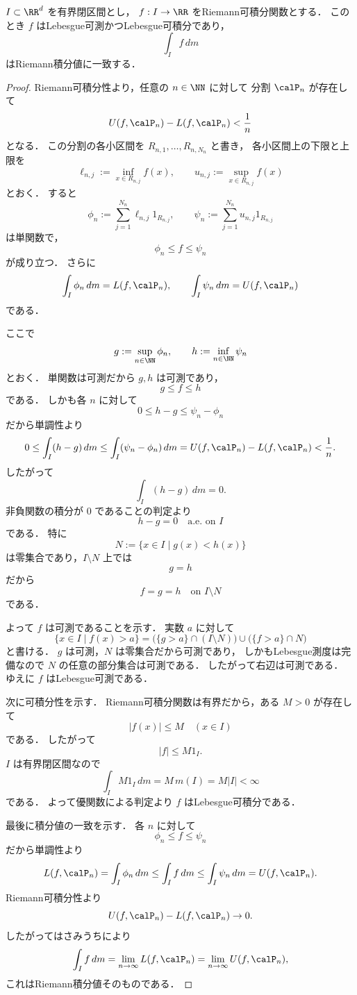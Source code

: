 \begin{theorem}[Riemann可積分ならLebesgue可積分]
$I \subset \RR^d$ を有界閉区間とし，
$f:I \to \RR$ をRiemann可積分関数とする．
このとき $f$ はLebesgue可測かつLebesgue可積分であり，
\[
\int_I f\,dm
\]
はRiemann積分値に一致する．
\end{theorem}
\begin{proof}
Riemann可積分性より，任意の $n \in \NN$ に対して
分割 $\calP_n$ が存在して
\[
U(f,\calP_n)-L(f,\calP_n)<\frac1n
\]
となる．
この分割の各小区間を $R_{n,1},\dots,R_{n,N_n}$ と書き，
各小区間上の下限と上限を
\[
\ell_{n,j}:=\inf_{x \in R_{n,j}} f(x),
\qquad
u_{n,j}:=\sup_{x \in R_{n,j}} f(x)
\]
とおく．
すると
\[
\phi_n:=\sum_{j=1}^{N_n} \ell_{n,j}1_{R_{n,j}},
\qquad
\psi_n:=\sum_{j=1}^{N_n} u_{n,j}1_{R_{n,j}}
\]
は単関数で，
\[
\phi_n \le f \le \psi_n
\]
が成り立つ．
さらに
\[
\int_I \phi_n\,dm = L(f,\calP_n),
\qquad
\int_I \psi_n\,dm = U(f,\calP_n)
\]
である．

ここで
\[
g:=\sup_{n\in\NN}\phi_n,
\qquad
h:=\inf_{n\in\NN}\psi_n
\]
とおく．
単関数は可測だから $g,h$ は可測であり，
\[
g \le f \le h
\]
である．
しかも各 $n$ に対して
\[
0 \le h-g \le \psi_n-\phi_n
\]
だから単調性より
\[
0 \le \int_I (h-g)\,dm
\le
\int_I (\psi_n-\phi_n)\,dm
=
U(f,\calP_n)-L(f,\calP_n)
<
\frac1n.
\]
したがって
\[
\int_I (h-g)\,dm=0.
\]
非負関数の積分が $0$ であることの判定より
\[
h-g=0 \quad \text{a.e.\ on } I
\]
である．
特に
\[
N:=\{x \in I \mid g(x)<h(x)\}
\]
は零集合であり，$I\setminus N$ 上では
\[
g=h
\]
だから
\[
f=g=h \quad \text{on } I\setminus N
\]
である．

よって $f$ は可測であることを示す．
実数 $a$ に対して
\[
\{x \in I \mid f(x)>a\}
=
\bigl(\{g>a\}\cap(I\setminus N)\bigr)\cup\bigl(\{f>a\}\cap N\bigr)
\]
と書ける．
$g$ は可測，$N$ は零集合だから可測であり，
しかもLebesgue測度は完備なので $N$ の任意の部分集合は可測である．
したがって右辺は可測である．
ゆえに $f$ はLebesgue可測である．

次に可積分性を示す．
Riemann可積分関数は有界だから，ある $M>0$ が存在して
\[
|f(x)|\le M \quad (x \in I)
\]
である．
したがって
\[
|f|\le M1_I.
\]
$I$ は有界閉区間なので
\[
\int_I M1_I\,dm = M\,m(I)=M|I|<\infty
\]
である．
よって優関数による判定より $f$ はLebesgue可積分である．

最後に積分値の一致を示す．
各 $n$ に対して
\[
\phi_n \le f \le \psi_n
\]
だから単調性より
\[
L(f,\calP_n)=\int_I \phi_n\,dm
\le
\int_I f\,dm
\le
\int_I \psi_n\,dm=U(f,\calP_n).
\]
Riemann可積分性より
\[
U(f,\calP_n)-L(f,\calP_n)\to 0.
\]
したがってはさみうちにより
\[
\int_I f\,dm
=
\lim_{n\to\infty}L(f,\calP_n)
=
\lim_{n\to\infty}U(f,\calP_n),
\]
これはRiemann積分値そのものである．
\end{proof}

